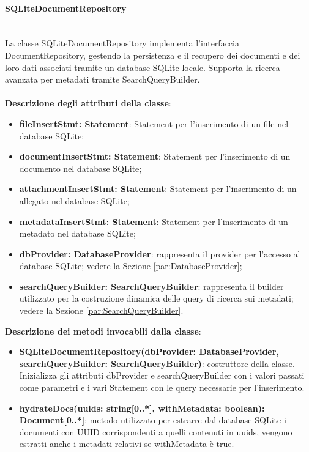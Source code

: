 \documentclass[a4paper,12pt]{article}
\begin{document}
                \paragraph{SQLiteDocumentRepository}\label{par:SQLiteDocumentRepository}\mbox{}\\
                La classe SQLiteDocumentRepository implementa l'interfaccia DocumentRepository, gestendo la persistenza e il recupero dei documenti e dei loro dati associati tramite un database SQLite locale. Supporta la ricerca avanzata per metadati tramite SearchQueryBuilder.\\
                \\
                \textbf{Descrizione degli attributi della classe}:
                \begin{itemize}
                    \item \textbf{fileInsertStmt: Statement}: Statement per l'inserimento di un file nel database SQLite;
                    \item \textbf{documentInsertStmt: Statement}: Statement per l'inserimento di un documento nel database SQLite;
                    \item \textbf{attachmentInsertStmt: Statement}: Statement per l'inserimento di un allegato nel database SQLite;
                    \item \textbf{metadataInsertStmt: Statement}: Statement per l'inserimento di un metadato nel database SQLite;
                    \item \textbf{dbProvider: DatabaseProvider}: rappresenta il provider per l'accesso al database SQLite; vedere la Sezione \ref{par:DatabaseProvider};
                    \item \textbf{searchQueryBuilder: SearchQueryBuilder}: rappresenta il builder utilizzato per la costruzione dinamica delle query di ricerca sui metadati; vedere la Sezione \ref{par:SearchQueryBuilder}.
                \end{itemize}
                \noindent \textbf{Descrizione dei metodi invocabili dalla classe}:
                \begin{itemize}
                    \item \textbf{SQLiteDocumentRepository(dbProvider: DatabaseProvider,\\ searchQueryBuilder: SearchQueryBuilder)}: costruttore della classe. Inizializza gli attributi dbProvider e searchQueryBuilder con i valori passati come parametri e i vari Statement con le query necessarie per l'inserimento.
                    \item \textbf{hydrateDocs(uuids: string[0..*], withMetadata: boolean): Document[0..*]}: metodo utilizzato per estrarre dal database SQLite i documenti con UUID corrispondenti a quelli contenuti in uuids, vengono estratti anche i metadati relativi se withMetadata è true. 
                \end{itemize}
\end{document}
